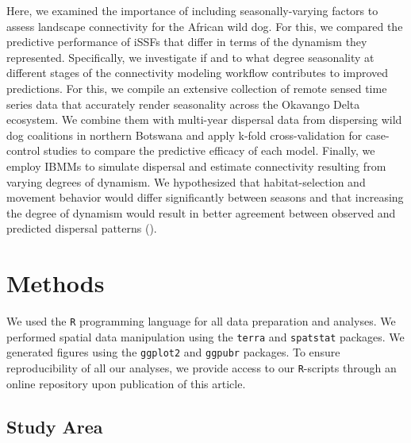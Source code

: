 \documentclass[abstract=on,10pt,a4paper,bibliography=totocnumbered]{article}
\newcommand{\inputy}[1]{\unskip}
\begin{document}
Here, we examined the importance of including seasonally-varying factors to
assess landscape connectivity for the African wild dog. For this, we compared
the predictive performance of iSSFs that differ in terms of the dynamism they
represented. Specifically, we investigate if and to what degree seasonality at
different stages of the connectivity modeling workflow contributes to improved
predictions. For this, we compile an extensive collection of remote sensed time
series data that accurately render seasonality across the Okavango Delta
ecosystem. We combine them with multi-year dispersal data from
\inputy{GeneralMetrics/CollarsTotal} dispersing wild dog coalitions in northern
Botswana and apply k-fold cross-validation for case-control studies to compare
the predictive efficacy of each model. Finally, we employ IBMMs to simulate
dispersal and estimate connectivity resulting from varying degrees of dynamism.
We hypothesized that habitat-selection and movement behavior would differ
significantly between seasons and that increasing the degree of dynamism would
result in better agreement between observed and predicted dispersal patterns
().

\section{Methods}

We used the \texttt{R} programming language \citep{RCoreTeam.2023} for all data
preparation and analyses. We performed spatial data manipulation using the
\texttt{terra} \citep{Hijmans.2024} and \texttt{spatstat} \citep{Baddeley.2015}
packages. We generated figures using the \texttt{ggplot2} \citep{Wickham.2024}
and \texttt{ggpubr} \citep{Kassambara.2024} packages. To ensure reproducibility
of all our analyses, we provide access to our \texttt{R}-scripts through an
online repository upon publication of this article.

\subsection{Study Area}
\end{document}
